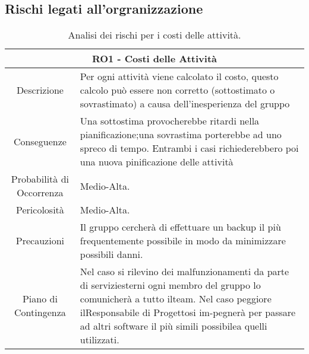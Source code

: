 \subsection{Rischi legati all'orgranizzazione}

\begin{table}[H]
    \begin{tabular}{|c | p{10cm}|}
    \hline
    \multicolumn{2}{|c|}{\textbf{RO1 - Costi delle Attività}} \\
    \hline
    Descrizione & Per ogni attività viene calcolato il costo, questo calcolo può essere non corretto (sottostimato o sovrastimato) a causa dell'inesperienza del gruppo\\ 
    \hline
    Conseguenze & Una sottostima provocherebbe ritardi nella pianificazione;una sovrastima porterebbe ad uno spreco di tempo. Entrambi i casi richiederebbero poi una nuova pinificazione delle attività\\
    \hline
    Probabilità di Occorrenza & Medio-Alta.\\
    \hline
    Pericolosità & Medio-Alta.\\
    \hline
    Precauzioni & Il gruppo cercherà di effettuare un backup il più frequentemente possibile in modo da minimizzare possibili danni.\\ 
    \hline
    Piano di Contingenza & Nel caso si rilevino dei malfunzionamenti da parte di serviziesterni ogni membro del gruppo lo comunicherà a tutto ilteam. Nel caso peggiore ilResponsabile di Progettosi im-pegnerà per passare ad altri software il più simili possibilea quelli utilizzati.\\ 
    \hline
    \end{tabular}
    \caption{\label{tab:RO1}Analisi dei rischi per i costi delle attività.}
    
\end{table}
